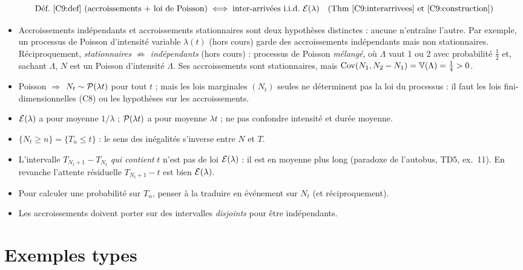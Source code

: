 \documentclass[11pt,a4paper]{article}
\begin{document}
\begin{liens}
\[\text{Déf.~\ref{C9:def} (accroissements + loi de Poisson)}\iff\text{inter-arrivées i.i.d.\ }\Expo(\lambda)\quad(\text{Thm~\ref{C9:interarrivees} et \ref{C9:construction}})\]
\begin{itemize}
  \item Accroissements indépendants et accroissements stationnaires sont deux hypothèses distinctes : aucune n'entraîne l'autre.
  Par exemple, un processus de Poisson d'intensité variable $\lambda(t)$ (hors cours) garde des accroissements indépendants mais
  non stationnaires. Réciproquement, \emph{stationnaires $\not\Rightarrow$ indépendants} (hors cours) : processus de Poisson \emph{mélangé}, où $\Lambda$ vaut 1 ou 2 avec probabilité $\frac12$ et, sachant $\Lambda$, $N$ est un Poisson d'intensité $\Lambda$. Ses accroissements sont stationnaires, mais $\operatorname{Cov}(N_1,N_2-N_1)=\operatorname{\mathbb{V}}(\Lambda)=\frac14>0$.
  \item Poisson $\Rightarrow$ $N_t\sim\mathcal{P}(\lambda t)$ pour tout $t$ ; mais les lois marginales $(N_t)$ seules ne déterminent pas la loi du processus : il faut les lois fini-dimensionnelles (C8) ou les hypothèses sur les accroissements.
\end{itemize}
\end{liens}

\begin{piege}
\begin{itemize}
  \item $\mathcal{E}(\lambda)$ a pour moyenne $1/\lambda$ ; $\mathcal{P}(\lambda t)$ a pour moyenne $\lambda t$ ; ne pas confondre intensité et durée moyenne.
  \item $\{N_t\ge n\}=\{T_n\le t\}$ : le sens des inégalités s'inverse entre $N$ et $T$.
  \item L'intervalle $T_{N_t+1}-T_{N_t}$ \emph{qui contient} $t$ n'est pas de loi $\mathcal{E}(\lambda)$ : il est en moyenne plus long
  (paradoxe de l'autobus, TD5, ex.~11). En revanche l'attente résiduelle $T_{N_t+1}-t$ est bien $\mathcal{E}(\lambda)$.
  \item Pour calculer une probabilité sur $T_n$, penser à la traduire en événement sur $N_t$ (et réciproquement).
  \item Les accroissements doivent porter sur des intervalles \emph{disjoints} pour être indépendants.
\end{itemize}
\end{piege}

\section*{Exemples types}
\end{document}
